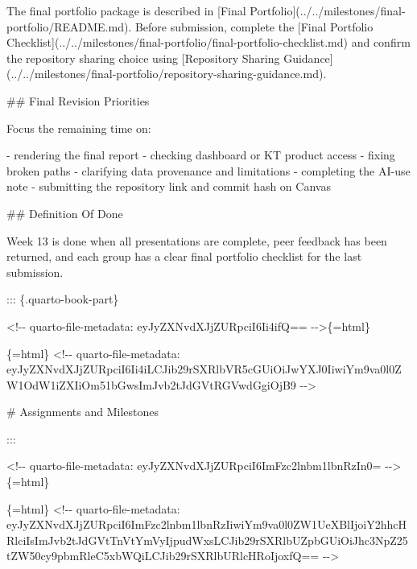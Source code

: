 \documentclass[
  letterpaper,
  DIV=11,
  numbers=noendperiod,
  oneside]{scrreprt}
\newenvironment{Shaded}{\begin{snugshade}}{\end{snugshade}}
\newcommand{\CommentTok}[1]{\textcolor[rgb]{0.37,0.37,0.37}{#1}}
\newcommand{\FunctionTok}[1]{\textcolor[rgb]{0.28,0.35,0.67}{#1}}
\newcommand{\InformationTok}[1]{\textcolor[rgb]{0.37,0.37,0.37}{#1}}
\newcommand{\NormalTok}[1]{\textcolor[rgb]{0.00,0.23,0.31}{#1}}
\newcommand{\OtherTok}[1]{\textcolor[rgb]{0.00,0.23,0.31}{#1}}
\newcommand{\SpecialStringTok}[1]{\textcolor[rgb]{0.13,0.47,0.30}{#1}}
\begin{document}
\begin{Shaded}
\begin{Highlighting}[numbers=left,,]
\NormalTok{The final portfolio package is described in }\CommentTok{[}\OtherTok{Final Portfolio}\CommentTok{](../../milestones/final{-}portfolio/README.md)}\NormalTok{. Before submission, complete the }\CommentTok{[}\OtherTok{Final Portfolio Checklist}\CommentTok{](../../milestones/final{-}portfolio/final{-}portfolio{-}checklist.md)}\NormalTok{ and confirm the repository sharing choice using }\CommentTok{[}\OtherTok{Repository Sharing Guidance}\CommentTok{](../../milestones/final{-}portfolio/repository{-}sharing{-}guidance.md)}\NormalTok{.}

\FunctionTok{\#\# Final Revision Priorities}

\NormalTok{Focus the remaining time on:}

\SpecialStringTok{{-} }\NormalTok{rendering the final report}
\SpecialStringTok{{-} }\NormalTok{checking dashboard or KT product access}
\SpecialStringTok{{-} }\NormalTok{fixing broken paths}
\SpecialStringTok{{-} }\NormalTok{clarifying data provenance and limitations}
\SpecialStringTok{{-} }\NormalTok{completing the AI{-}use note}
\SpecialStringTok{{-} }\NormalTok{submitting the repository link and commit hash on Canvas}

\FunctionTok{\#\# Definition Of Done}

\NormalTok{Week 13 is done when all presentations are complete, peer feedback has been returned, and each group has a clear final portfolio checklist for the last submission.}


\NormalTok{::: \{.quarto{-}book{-}part\}}


\InformationTok{\textasciigrave{}\textless{}!{-}{-} quarto{-}file{-}metadata: eyJyZXNvdXJjZURpciI6Ii4ifQ== {-}{-}\textgreater{}\textasciigrave{}}\NormalTok{\{=html\}}

\InformationTok{\textasciigrave{}\textasciigrave{}\textasciigrave{}\{=html\}}
\InformationTok{\textless{}!{-}{-} quarto{-}file{-}metadata: eyJyZXNvdXJjZURpciI6Ii4iLCJib29rSXRlbVR5cGUiOiJwYXJ0IiwiYm9va0l0ZW1OdW1iZXIiOm51bGwsImJvb2tJdGVtRGVwdGgiOjB9 {-}{-}\textgreater{}}
\InformationTok{\textasciigrave{}\textasciigrave{}\textasciigrave{}}

\FunctionTok{\# Assignments and Milestones}


\NormalTok{:::}



\InformationTok{\textasciigrave{}\textless{}!{-}{-} quarto{-}file{-}metadata: eyJyZXNvdXJjZURpciI6ImFzc2lnbm1lbnRzIn0= {-}{-}\textgreater{}\textasciigrave{}}\NormalTok{\{=html\}}

\InformationTok{\textasciigrave{}\textasciigrave{}\textasciigrave{}\{=html\}}
\InformationTok{\textless{}!{-}{-} quarto{-}file{-}metadata: eyJyZXNvdXJjZURpciI6ImFzc2lnbm1lbnRzIiwiYm9va0l0ZW1UeXBlIjoiY2hhcHRlciIsImJvb2tJdGVtTnVtYmVyIjpudWxsLCJib29rSXRlbUZpbGUiOiJhc3NpZ25tZW50cy9pbmRleC5xbWQiLCJib29rSXRlbURlcHRoIjoxfQ== {-}{-}\textgreater{}}
\InformationTok{\textasciigrave{}\textasciigrave{}\textasciigrave{}}


\end{Highlighting}
\end{Shaded}
\end{document}
